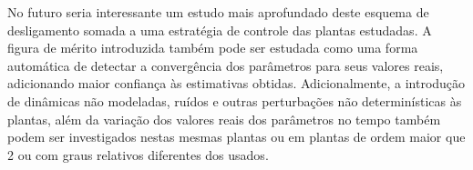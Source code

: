 \documentclass[
	12pt,				%
	openright,			%
	twoside,			%
	a4paper,			%
	english,			%
	french,				%
	spanish,			%
	brazil				%
	]{abntex2}
\begin{document}
No futuro seria interessante um estudo mais aprofundado deste esquema de desligamento somada a uma estratégia de controle das plantas estudadas. A figura de mérito introduzida também pode ser estudada como uma forma automática de detectar a convergência dos parâmetros para seus valores reais, adicionando maior confiança às estimativas obtidas. Adicionalmente, a introdução de dinâmicas não modeladas, ruídos e outras perturbações não determinísticas às plantas, além da variação dos valores reais dos parâmetros no tempo também podem ser investigados nestas mesmas plantas ou em plantas de ordem maior que 2 ou com graus relativos diferentes dos usados.\\  

\postextual



%
%

\end{document}
